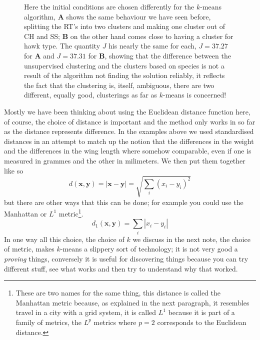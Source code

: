 \documentclass[12pt]{article}
\begin{document}
\begin{figure}[htb]
\begin{tabular}{ll}
    \end{tabular}
    \caption{Here the initial conditions are chosen differently for
      the $k$-means algorithm, \textbf{A} shows the same behaviour we
      have seen before, splitting the RT's into two clusters and
      making one cluster out of CH and SS; \textbf{B} on the other
      hand comes close to having a cluster for hawk type. The quantity
      $J$ his nearly the same for each, $J=37.27$ for \textbf{A} and
      $J=37.31$ for \textbf{B}, showing that the difference between
      the unsupervised clustering and the clusters based on species is
      not a result of the algorithm not finding the solution reliably,
      it reflects the fact that the clustering is, itself, ambiguous,
      there are two different, equally good, clusterings as far as
      $k$-means is concerned!
\label{fig:khawks_different_starts}}
\end{figure}



Mostly we have been thinking about using the Euclidean distance
function here, of course, the choice of distance is important and the
method only works in so far as the distance represents difference. In
the examples above we used standardised distances in an attempt to
match up the notion that the differences in the weight and the
differences in the wing length where somehow comparable, even if one
is measured in grammes and the other in milimeters. We then put them
together like so
\begin{equation}
  d(\textbf{x},\textbf{y})=|\textbf{x}-\textbf{y}|=\sqrt{\sum_i (x_i-y_i)^2}
\end{equation}
but there are other ways that this can be done; for example you could
use the Manhattan or $L^1$ metric\footnote{These are two names for the
same thing, this distance is called the Manhattan metric because, as
explained in the next paragraph, it resembles travel in a city with a
grid system, it is called $L^1$ because it is part of a family of metrics, the $L^p$ metrics where $p=2$ corresponds to the Euclidean distance.}.
\begin{equation}
  d_1(\mathbf{x},\mathbf{y})=\sum_i |x_i-y_i|
\end{equation}
In one way all this choice, the choice of $k$ we discuss in the next
note, the choice of metric, makes $k$-means a slippery sort of
technology; it is not very good a \textsl{proving} things, conversely
it is useful for discovering things because you can try different
stuff, see what works and then try to understand why that worked.
\end{document}
